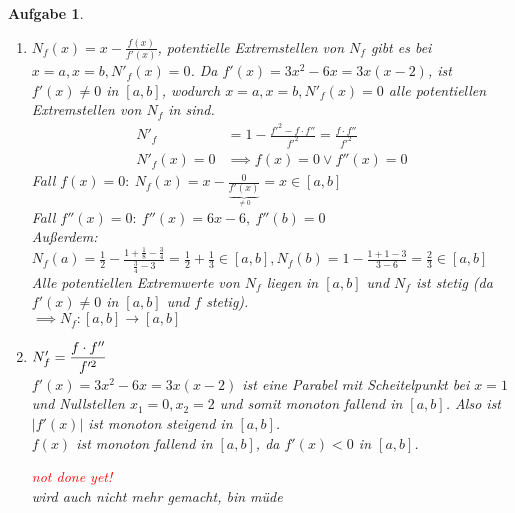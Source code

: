 \documentclass[11pt]{article}
\theoremstyle{break}
\newtheorem{task}{Aufgabe}
\newcommand{\abs}[1]{\ensuremath{\left\vert #1 \right\vert}}
\newcommand{\ndy}{
    \textcolor{red} {\hfill not done yet!}
    \reversemarginpar
    \marginpar{\raggedleft\textcolor{red}{\rule{2mm}{2mm}}}
}
\begin{document}
\begin{task}
    \hfill\vspace{-5mm}
    \begin{enumerate}[label={(\alph*)}]
        \item $N_f(x) = x - \frac{f(x)}{f'(x)}$, potentielle Extremstellen von $N_f$ gibt es bei $x=a, x=b, N'_f(x) = 0$. 
        Da $f'(x) = 3x^2 - 6x = 3x(x-2)$, ist $f'(x)\neq 0$ in $[a,b]$, wodurch $x=a, x=b, N'_f(x) = 0$ alle potentiellen Extremstellen von $N_f$ in sind.
        \begin{align*}
        N'_f &= 1-\frac{f'^2 - f\cdot f''}{f'^2} = \frac{f\cdot f''}{f'^2}\\ 
        N'_f(x) = 0 &\implies f(x)=0\lor f''(x)=0
        \end{align*}
        Fall $f(x)=0:\ N_f(x) = x - \frac{0}{\underbrace{f'(x)}_{\neq 0}} = x \in [a,b]$\\
        Fall $f''(x)=0:\ f''(x) = 6x-6,\ f''(b)=0$\\
        Außerdem: $N_f(a) =\frac{1}{2} - \frac{1 + \frac{1}{8} - \frac{3}{4}}{\frac{3}{4}-3} = \frac{1}{2} + \frac{1}{3} \in [a,b], N_f(b) = 1 - \frac{1 + 1 - 3}{3-6} = \frac{2}{3}\in [a,b]$\vspace{3mm}\\
        Alle potentiellen Extremwerte von $N_f$ liegen in $[a,b]$ und $N_f$ ist stetig (da $f'(x)\neq 0$ in $[a,b]$ und $f$ stetig).\\
        $\implies N_f:[a,b]\rightarrow [a,b]$
        \item $N'_f = \begin{displaystyle} \frac{f\cdot f''}{f'^2} \end{displaystyle}$\vspace{3mm}\\
        $f'(x) = 3x^2 - 6x = 3x(x-2)$ ist eine Parabel mit Scheitelpunkt bei $x=1$ und Nullstellen $x_1=0, x_2=2$ und somit monoton fallend in $[a,b]$. Also ist $\abs{f'(x)}$ ist monoton steigend in $[a,b]$.\vspace{3mm}\\
        $f(x)$ ist monoton fallend in $[a,b]$, da $f'(x)<0$ in $[a,b]$.
        \ndy\\
        \textit{wird auch nicht mehr gemacht, bin müde}
    \end{enumerate}
\end{task}
\newpage
\end{document}
